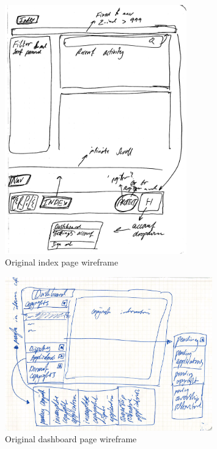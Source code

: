 \begin{figure}[H]
\caption{Original index page wireframe}
\centering
\includegraphics[width=0.7\textwidth,height=\textheight,keepaspectratio]{images/appendix/design/docs/index}
\end{figure}

\begin{figure}[H]
\caption{Original dashboard page wireframe}
\centering
\includegraphics[width=0.8\textwidth,height=\textheight,keepaspectratio]{images/appendix/design/docs/dash}
\end{figure}


